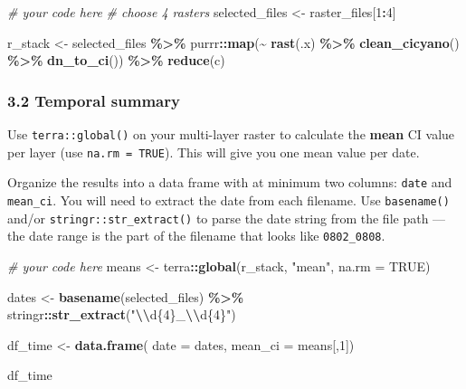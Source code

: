 \documentclass[
]{article}
\newenvironment{Shaded}{\begin{snugshade}}{\end{snugshade}}
\newcommand{\AttributeTok}[1]{\textcolor[rgb]{0.13,0.29,0.53}{#1}}
\newcommand{\CommentTok}[1]{\textcolor[rgb]{0.56,0.35,0.01}{\textit{#1}}}
\newcommand{\ConstantTok}[1]{\textcolor[rgb]{0.56,0.35,0.01}{#1}}
\newcommand{\DecValTok}[1]{\textcolor[rgb]{0.00,0.00,0.81}{#1}}
\newcommand{\FunctionTok}[1]{\textcolor[rgb]{0.13,0.29,0.53}{\textbf{#1}}}
\newcommand{\NormalTok}[1]{#1}
\newcommand{\OtherTok}[1]{\textcolor[rgb]{0.56,0.35,0.01}{#1}}
\newcommand{\SpecialCharTok}[1]{\textcolor[rgb]{0.81,0.36,0.00}{\textbf{#1}}}
\newcommand{\StringTok}[1]{\textcolor[rgb]{0.31,0.60,0.02}{#1}}
\begin{document}
\begin{Shaded}
\begin{Highlighting}[]
\CommentTok{\# your code here}
\CommentTok{\# choose 4 rasters}
\NormalTok{selected\_files }\OtherTok{\textless{}{-}}\NormalTok{ raster\_files[}\DecValTok{1}\SpecialCharTok{:}\DecValTok{4}\NormalTok{]}

\NormalTok{r\_stack }\OtherTok{\textless{}{-}}\NormalTok{ selected\_files }\SpecialCharTok{\%\textgreater{}\%}
\NormalTok{  purrr}\SpecialCharTok{::}\FunctionTok{map}\NormalTok{(}\SpecialCharTok{\textasciitilde{}} \FunctionTok{rast}\NormalTok{(.x) }\SpecialCharTok{\%\textgreater{}\%}
               \FunctionTok{clean\_cicyano}\NormalTok{() }\SpecialCharTok{\%\textgreater{}\%}
               \FunctionTok{dn\_to\_ci}\NormalTok{()) }\SpecialCharTok{\%\textgreater{}\%} \FunctionTok{reduce}\NormalTok{(c)}
\end{Highlighting}
\end{Shaded}

\hypertarget{temporal-summary}{%
\subsubsection{3.2 Temporal summary}\label{temporal-summary}}

Use \texttt{terra::global()} on your multi-layer raster to calculate the
\textbf{mean} CI value per layer (use \texttt{na.rm\ =\ TRUE}). This
will give you one mean value per date.

Organize the results into a data frame with at minimum two columns:
\texttt{date} and \texttt{mean\_ci}. You will need to extract the date
from each filename. Use \texttt{basename()} and/or
\texttt{stringr::str\_extract()} to parse the date string from the file
path --- the date range is the part of the filename that looks like
\texttt{0802\_0808}.

\begin{Shaded}
\begin{Highlighting}[]
\CommentTok{\# your code here}
\NormalTok{means }\OtherTok{\textless{}{-}}\NormalTok{ terra}\SpecialCharTok{::}\FunctionTok{global}\NormalTok{(r\_stack, }\StringTok{"mean"}\NormalTok{, }\AttributeTok{na.rm =} \ConstantTok{TRUE}\NormalTok{)}

\NormalTok{dates }\OtherTok{\textless{}{-}} \FunctionTok{basename}\NormalTok{(selected\_files) }\SpecialCharTok{\%\textgreater{}\%}
\NormalTok{  stringr}\SpecialCharTok{::}\FunctionTok{str\_extract}\NormalTok{(}\StringTok{"}\SpecialCharTok{\textbackslash{}\textbackslash{}}\StringTok{d\{4\}\_}\SpecialCharTok{\textbackslash{}\textbackslash{}}\StringTok{d\{4\}"}\NormalTok{)}

\NormalTok{df\_time }\OtherTok{\textless{}{-}} \FunctionTok{data.frame}\NormalTok{(}
  \AttributeTok{date =}\NormalTok{ dates,}
  \AttributeTok{mean\_ci =}\NormalTok{ means[,}\DecValTok{1}\NormalTok{])}

\NormalTok{df\_time}
\end{Highlighting}
\end{Shaded}
\end{document}
